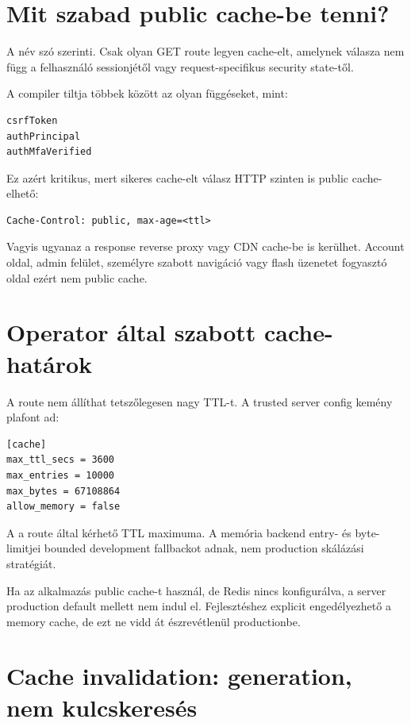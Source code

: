 \section{Mit szabad public cache-be tenni?}

A  név szó szerinti. Csak olyan GET route legyen cache-elt, amelynek válasza nem függ a felhasználó sessionjétől vagy request-specifikus security state-től.

A compiler tiltja többek között az olyan függéseket, mint:

\begin{lstlisting}
csrfToken
authPrincipal
authMfaVerified
\end{lstlisting}

Ez azért kritikus, mert sikeres cache-elt válasz HTTP szinten is public cache-elhető:

\begin{lstlisting}
Cache-Control: public, max-age=<ttl>
\end{lstlisting}

Vagyis ugyanaz a response reverse proxy vagy CDN cache-be is kerülhet. Account oldal, admin felület, személyre szabott navigáció vagy flash üzenetet fogyasztó oldal ezért nem public cache.

\section{Operator által szabott cache-határok}

A route nem állíthat tetszőlegesen nagy TTL-t. A trusted server config kemény plafont ad:

\begin{lstlisting}
[cache]
max_ttl_secs = 3600
max_entries = 10000
max_bytes = 67108864
allow_memory = false
\end{lstlisting}

A  a route által kérhető TTL maximuma. A memória backend entry- és byte-limitjei bounded development fallbackot adnak, nem production skálázási stratégiát.

Ha az alkalmazás public cache-t használ, de Redis nincs konfigurálva, a server production default mellett nem indul el. Fejlesztéshez explicit engedélyezhető a memory cache, de ezt ne vidd át észrevétlenül productionbe.

\section{Cache invalidation: generation, nem kulcskeresés}

